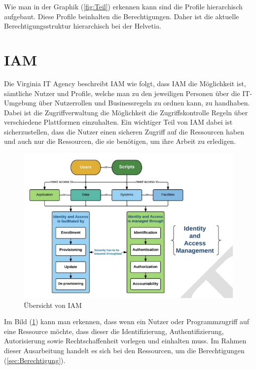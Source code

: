 Wie man in der Graphik (\ref{fig:Teil}) erkennen kann sind die Profile hierarchisch aufgebaut.
Diese Profile beinhalten die Berechtigungen.
Daher ist die aktuelle Berechtigungsstruktur hierarchisch bei der Helvetia.


\section{IAM}
\label{subsec:IAM}
Die Virginia IT Agency beschreibt IAM wie folgt, dass \ac{IAM} die Möglichkeit ist, sämtliche Nutzer und Profile, welche man zu den jeweiligen Personen über die IT-Umgebung über Nutzerrollen und Businessregeln zu ordnen kann, zu handhaben. Dabei ist die Zugriffverwaltung die Möglichkeit die Zugriffskontrolle Regeln über verschiedene Plattformen einzuhalten. Ein wichtiger Teil von \ac{IAM} dabei ist sicherzustellen, dass die Nutzer einen sicheren Zugriff auf die Ressourcen haben und auch nur die Ressourcen, die sie benötigen, um ihre Arbeit zu erledigen. \cite{Virg07}
\begin{figure}[h!]
 \centering
 \includegraphics[width=1\textwidth]{gfx/Picture/IAM.PNG}
 \caption{Übersicht von IAM \cite{Moha19}}
 \label{fig:IAM}
\end{figure}
Im Bild (\ref{fig:IAM}) kann man erkennen, dass wenn ein Nutzer oder Programmzugriff auf eine Ressource möchte, dass dieser die Identifizierung, Authentifizierung, Autorisierung  sowie Rechtschaffenheit vorlegen und einhalten muss. \cite{Moha19}
\newline
Im Rahmen dieser Ausarbeitung handelt es sich bei den Ressourcen, um die Berechtigungen (\ref{sec:Berechtigung}).
